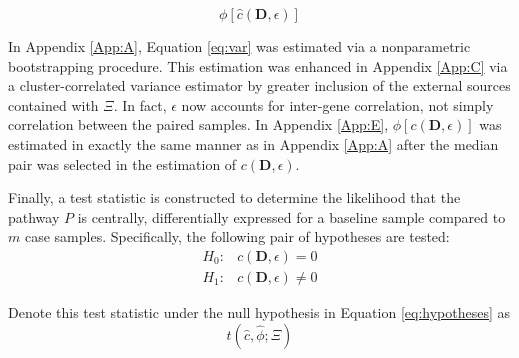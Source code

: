 \begin{equation}
\label{eq:var}
\phi[\hat{c}(\mathbf{D}, \epsilon)] \tag{2}
\end{equation}

In Appendix \ref{App:A}, Equation \ref{eq:var} was estimated via a nonparametric bootstrapping procedure. This estimation was enhanced in Appendix \ref{App:C} via a cluster-correlated variance estimator by greater inclusion of the external sources contained with $\Xi$. In fact, $\epsilon$ now accounts for inter-gene correlation, not simply correlation between the paired samples. In Appendix \ref{App:E}, $\phi[c(\mathbf{D}, \epsilon)]$ was estimated in exactly the same manner as in Appendix \ref{App:A} after the median pair was selected in the estimation of $c(\mathbf{D}, \epsilon)$.

Finally, a test statistic is constructed to determine the likelihood that the pathway $P$ is centrally, differentially expressed for a baseline sample compared to $m$ case samples. Specifically, the following pair of hypotheses are tested:
\begin{equation}
  \label{eq:hypotheses}
\begin{array}{rl} \tag{3}
  H_{0}: & c(\mathbf{D}, \epsilon) = 0 \\
  H_{1}: & c(\mathbf{D}, \epsilon) \neq 0
\end{array}
\end{equation}

\noindent \noindent Denote this test statistic under the null hypothesis in Equation \ref{eq:hypotheses} as
\begin{equation}
\label{eq:testStat}
t(\hat{c}, \hat{\phi}; \Xi) \tag{4}
\end{equation}







